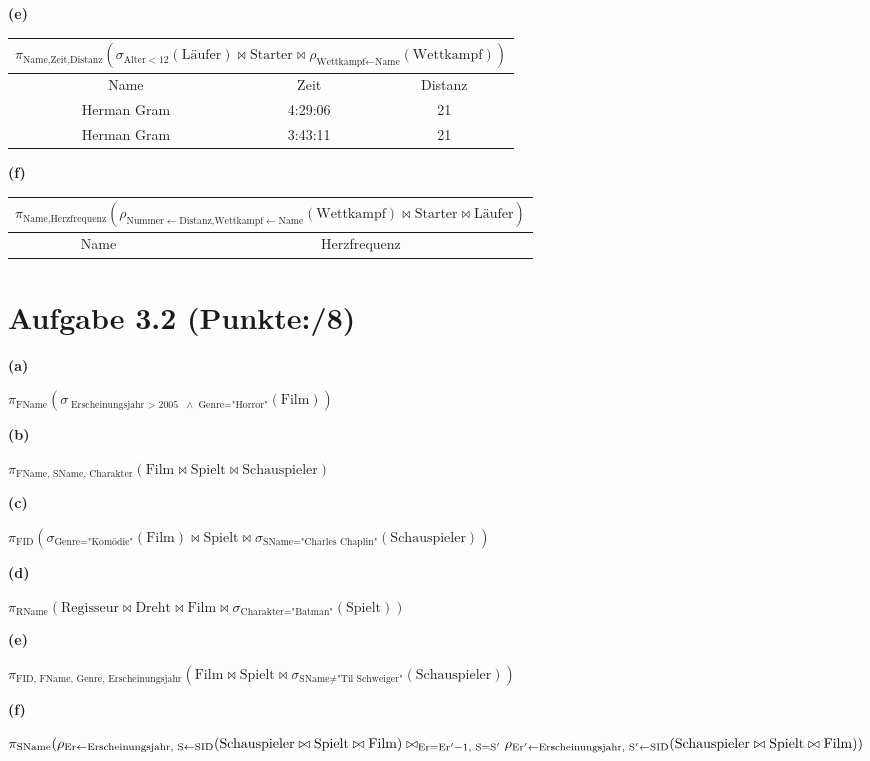 \documentclass[11pt, a4paper]{article}
\newcommand{\blattnummer}{3}
\newcommand{\pp}{8}
\newcommand{\aufgabe}[2] {\section*{Aufgabe \blattnummer.#1 (Punkte:\qquad/#2)}}
\newcommand{\aufgabenteil}[1] {\textbf{(#1)}}
\begin{document}
\aufgabenteil{e}
\begin{adjustwidth}{20pt}{20pt}
\begin{tabular}{|c c c|}\hline
\multicolumn{3}{|c|}{$\pi_{\text{Name,Zeit,Distanz}}(\sigma_{\text{Alter}<12}(\text{Läufer})\bowtie\text{Starter}\bowtie\rho_{\text{Wettkampf$\leftarrow$Name}}(\text{Wettkampf}))$} \\\hline
Name & Zeit & Distanz \\\hline
Herman Gram & 4:29:06 & 21 \\
Herman Gram & 3:43:11 & 21 \\\hline
\end{tabular}
\end{adjustwidth}
\aufgabenteil{f}
\begin{adjustwidth}{20pt}{20pt}
\begin{tabular}{|c c|}\hline
\multicolumn{2}{|c|}{$\pi_{\text{Name,Herzfrequenz}}(\rho_{\text{Nummer$\leftarrow$Distanz,Wettkampf$\leftarrow$Name}}(\text{Wettkampf})\bowtie\text{Starter}\bowtie\text{Läufer})$} \\\hline
Name & Herzfrequenz \\\hline
\end{tabular}
\end{adjustwidth}


\aufgabe{2}{\pp}
\aufgabenteil{a}
\begin{adjustwidth}{20pt}{20pt}
$\pi_{\text{FName}}(\sigma_{\text{Erscheinungsjahr $>$ 2005 } \wedge \text{ Genre="Horror"} }(\text{Film}))$ 
\end{adjustwidth}
\aufgabenteil{b}
\begin{adjustwidth}{20pt}{20pt}
$\pi_{\text{FName, SName, Charakter}}(\text{Film} \bowtie \text{Spielt} \bowtie \text{Schauspieler})$
\end{adjustwidth}
\aufgabenteil{c}
\begin{adjustwidth}{20pt}{20pt}
$\pi_{\text{FID}}(\sigma_{\text{Genre="Komödie"} }(\text{Film}) \bowtie \text{Spielt} \bowtie \sigma_{\text{SName="Charles Chaplin"}}(\text{Schauspieler}))$
\end{adjustwidth}
\aufgabenteil{d}
\begin{adjustwidth}{20pt}{20pt}
$\pi_{\text{RName}}(\text{Regisseur} \bowtie \text{Dreht} \bowtie \text{Film} \bowtie \sigma_{\text{Charakter="Batman"}}(\text{Spielt}))$
\end{adjustwidth}
\aufgabenteil{e}
\begin{adjustwidth}{20pt}{20pt}
$\pi_{\text{FID, FName, Genre, Erscheinungsjahr}}(\text{Film} \bowtie \text{Spielt} \bowtie \sigma_{\text{SName} \neq \text{"Til Schweiger"}}(\text{Schauspieler}))$
\end{adjustwidth}
\aufgabenteil{f}
\begin{adjustwidth}{20pt}{20pt}
$\pi_{\text{SName}}(\rho_{\text{Er} \leftarrow \text{Erscheinungsjahr}, \text{ S} \leftarrow \text{SID}}(\text{Schauspieler} \bowtie \text{Spielt} \bowtie \text{Film}) \bowtie_{\text{Er}=\text{Er}^\prime - 1, \text{ S}=\text{S}^\prime} \newline
\rho_{\text{Er}^\prime \leftarrow \text{Erscheinungsjahr}, \text{ S}^\prime \leftarrow \text{SID}}(\text{Schauspieler} \bowtie \text{Spielt} \bowtie \text{Film}))$
\end{adjustwidth}
\end{document}
